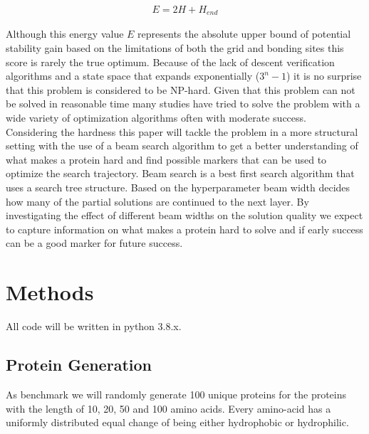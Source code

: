 \documentclass{article}
\begin{document}
\begin{align}
    E = 2 H + H_{end}
    \label{eq:hp}
\end{align}

Although this energy value $E$ represents the absolute upper bound of potential stability gain based on the limitations of both the grid and bonding sites this score is rarely the true optimum. Because of the lack of descent verification algorithms and a state space that expands exponentially ($3^n-1$) it is no surprise that this problem is considered to be NP-hard.
Given that this problem can not be solved in reasonable time many studies have tried to solve the problem with a wide variety of optimization algorithms often with moderate success. \\
Considering the hardness this paper will tackle the problem in a more structural setting with the use of a beam search algorithm to get a better understanding of what makes a protein hard and find possible markers that can be used to optimize the search trajectory. 
Beam search is a best first search algorithm that uses a search tree structure. Based on  the hyperparameter beam width decides how many of the partial solutions are continued to the next layer. By investigating the effect of different beam widths on the solution quality we expect to capture information on what makes a protein hard to solve and if early success can be a good marker for future success.



\section{Methods}
All code will be written in python 3.8.x.

\subsection{Protein Generation}
As benchmark we will randomly generate 100 unique proteins for the proteins with the length of 10, 20, 50 and 100 amino acids. Every amino-acid has a uniformly distributed equal change of being either hydrophobic or hydrophilic.
\end{document}
